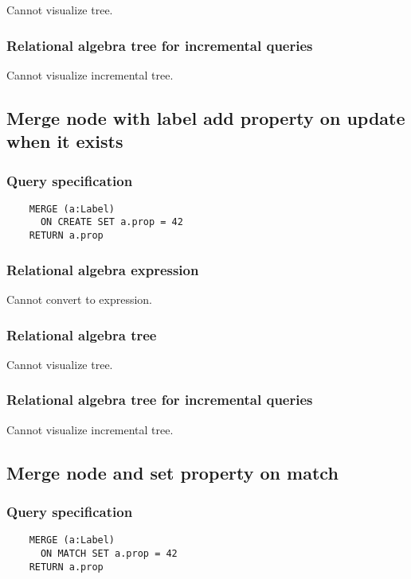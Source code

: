 	Cannot visualize tree.

	\subsubsection*{Relational algebra tree for incremental queries}

	Cannot visualize incremental tree.
	\subsection{Merge node with label add property on update when it exists}

	\subsubsection*{Query specification}

	\begin{lstlisting}
	MERGE (a:Label)
	  ON CREATE SET a.prop = 42
	RETURN a.prop
	\end{lstlisting}


	\subsubsection*{Relational algebra expression}

	Cannot convert to expression.

	\subsubsection*{Relational algebra tree}

	Cannot visualize tree.

	\subsubsection*{Relational algebra tree for incremental queries}

	Cannot visualize incremental tree.
	\subsection{Merge node and set property on match}

	\subsubsection*{Query specification}

	\begin{lstlisting}
	MERGE (a:Label)
	  ON MATCH SET a.prop = 42
	RETURN a.prop
	\end{lstlisting}


